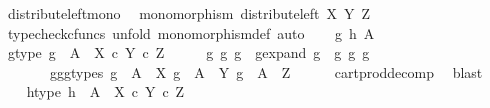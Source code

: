 \begin{isabellebody}
\endisatagproof
{\isafoldproof}%
%
\isadelimproof
\isanewline
%
\endisadelimproof
\isanewline
{}\isamarkupfalse%
\ distribute{\isacharunderscore}{\kern0pt}left{\isacharunderscore}{\kern0pt}mono{\isacharcolon}{\kern0pt}\isanewline
\ \ {\isachardoublequoteopen}monomorphism\ {\isacharparenleft}{\kern0pt}distribute{\isacharunderscore}{\kern0pt}left\ X\ Y\ Z{\isacharparenright}{\kern0pt}{\isachardoublequoteclose}\isanewline
%
\isadelimproof
%
\endisadelimproof
%
\isatagproof
{}\isamarkupfalse%
\ {\isacharparenleft}{\kern0pt}typecheck{\isacharunderscore}{\kern0pt}cfuncs{\isacharcomma}{\kern0pt}\ unfold\ monomorphism{\isacharunderscore}{\kern0pt}def{}{\isacharcomma}{\kern0pt}\ auto{\isacharparenright}{\kern0pt}\isanewline
\ \ \isamarkupfalse%
\ g\ h\ A\isanewline
\ \ \isamarkupfalse%
\ g{\isacharunderscore}{\kern0pt}type{\isacharcolon}{\kern0pt}\ {\isachardoublequoteopen}g\ {\isacharcolon}{\kern0pt}\ A\ {\isasymrightarrow}\ X\ {\isasymtimes}\isactrlsub c\ {\isacharparenleft}{\kern0pt}Y\ {\isasymtimes}\isactrlsub c\ Z{\isacharparenright}{\kern0pt}{\isachardoublequoteclose}\isanewline
\ \ \isamarkupfalse%
\ \isamarkupfalse%
\ g{}\ g{}\ g{}\ \ g{\isacharunderscore}{\kern0pt}expand{\isacharcolon}{\kern0pt}\ {\isachardoublequoteopen}g\ {\isacharequal}{\kern0pt}\ {\isasymlangle}g{}{\isacharcomma}{\kern0pt}\ {\isasymlangle}g{}{\isacharcomma}{\kern0pt}\ g{}{\isasymrangle}{\isasymrangle}{\isachardoublequoteclose}\isanewline
\ \ \ \ \ \ \ g{}{\isacharunderscore}{\kern0pt}g{}{\isacharunderscore}{\kern0pt}g{}{\isacharunderscore}{\kern0pt}types{\isacharcolon}{\kern0pt}\ {\isachardoublequoteopen}g{}\ {\isacharcolon}{\kern0pt}\ A\ {\isasymrightarrow}\ X{\isachardoublequoteclose}\ {\isachardoublequoteopen}g{}\ {\isacharcolon}{\kern0pt}\ A\ {\isasymrightarrow}\ Y{\isachardoublequoteclose}\ {\isachardoublequoteopen}g{}\ {\isacharcolon}{\kern0pt}\ A\ {\isasymrightarrow}\ Z{\isachardoublequoteclose}\isanewline
\ \ \ \ \isamarkupfalse%
\ cart{\isacharunderscore}{\kern0pt}prod{\isacharunderscore}{\kern0pt}decomp\ \isamarkupfalse%
\ blast\ \isanewline
\ \ \isamarkupfalse%
\ h{\isacharunderscore}{\kern0pt}type{\isacharcolon}{\kern0pt}\ {\isachardoublequoteopen}h\ {\isacharcolon}{\kern0pt}\ A\ {\isasymrightarrow}\ X\ {\isasymtimes}\isactrlsub c\ {\isacharparenleft}{\kern0pt}Y\ {\isasymtimes}\isactrlsub c\ Z{\isacharparenright}{\kern0pt}{\isachardoublequoteclose}\isanewline

\end{isabellebody}
